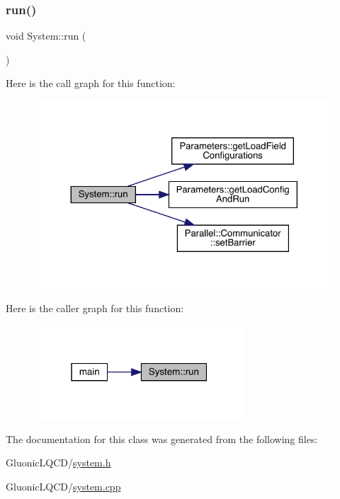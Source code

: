 \subsubsection{\texorpdfstring{run()}{run()}}
{\footnotesize\ttfamily void System\+::run (\begin{DoxyParamCaption}{ }\end{DoxyParamCaption})}

Here is the call graph for this function\+:\nopagebreak
\begin{figure}[H]
\begin{center}
\leavevmode
\includegraphics[width=324pt]{class_system_afa39feb75f96798930f4bfb48205f40b_cgraph}
\end{center}
\end{figure}
Here is the caller graph for this function\+:\nopagebreak
\begin{figure}[H]
\begin{center}
\leavevmode
\includegraphics[width=223pt]{class_system_afa39feb75f96798930f4bfb48205f40b_icgraph}
\end{center}
\end{figure}


The documentation for this class was generated from the following files\+:\begin{DoxyCompactItemize}
\item 
Gluonic\+L\+Q\+C\+D/\mbox{\hyperlink{system_8h}{system.\+h}}\item 
Gluonic\+L\+Q\+C\+D/\mbox{\hyperlink{system_8cpp}{system.\+cpp}}\end{DoxyCompactItemize}
